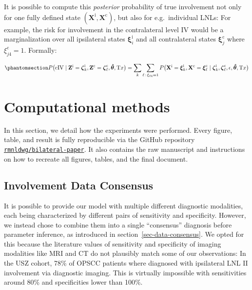 \documentclass[
  sn-mathphys-num,
]{sn-jnl}
\begin{document}
It is possible to compute this \emph{posterior} probability of true
involvement not only for one fully defined state
\((\mathbf{X}^\text{i}, \mathbf{X}^\text{c})\), but also for
e.g.~individual LNLs: For example, the risk for involvement in the
contralateral level IV would be a marginalization over all ipsilateral
states \(\boldsymbol{\xi}^\text{i}_i\) and all contralateral states
\(\boldsymbol{\xi}^\text{c}_j\) where \(\xi^\text{c}_{j4}=1\). Formally:

\begin{equation}\phantomsection\label{eq-marg-over-posterior}{
P \big( \text{cIV} \mid \mathbf{Z}^\text{i}=\boldsymbol{\zeta}^\text{i}_k, \mathbf{Z}^\text{c}=\boldsymbol{\zeta}^\text{c}_\ell, \boldsymbol{\hat{\theta}}, \text{T}x \big) = \sum_k \sum_{\ell \, : \, \xi_{\ell 4}=1} P \big( \mathbf{X}^\text{i} = \boldsymbol{\xi}^\text{i}_k, \mathbf{X}^\text{c} = \boldsymbol{\xi}^\text{c}_\ell \mid \boldsymbol{\zeta}^\text{i}_k, \boldsymbol{\zeta}^\text{c}_\ell, \epsilon, \boldsymbol{\hat{\theta}}, \text{T}x \big)
}\end{equation}

\section{Computational methods}\label{sec-methods}

In this section, we detail how the experiments were performed. Every
figure, table, and result is fully reproducible via the GitHub
repository
\href{https://github.com/rmnldwg/bilateral-paper}{\texttt{rmnldwg/bilateral-paper}}.
It also contains the raw manuscript and instructions on how to recreate
all figures, tables, and the final document.

\subsection{Involvement Data Consensus}\label{sec-methods-consensus}

It is possible to provide our model with multiple different diagnostic
modalities, each being characterized by different pairs of sensitivity
and specificity. However, we instead chose to combine them into a single
``consensus'' diagnosis before parameter inference, as introduced in
section~\ref{sec-data-consensus}. We opted for this because the
literature values of sensitivity and specificity
\citep{de_bondt_detection_2007, kyzas_18f-fluorodeoxyglucose_2008} of
imaging modalities like MRI and CT do not plausibly match some of our
observations: In the USZ cohort, 78\% of OPSCC patients where diagnosed
with ipsilateral LNL II involvement via diagnostic imaging. This is
virtually impossible with sensitivities around 80\% and specificities
lower than 100\%.
\end{document}
